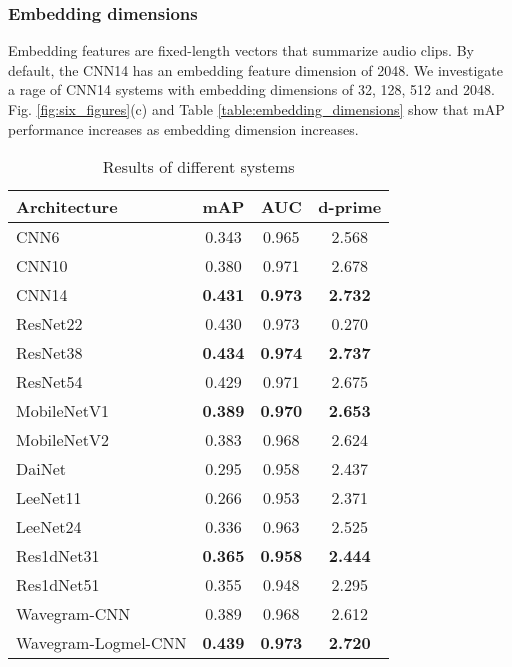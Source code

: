 \documentclass[journal]{IEEEtran}
\begin{document}
\subsubsection{Embedding dimensions}
Embedding features are fixed-length vectors that summarize audio clips. By default, the CNN14 has an embedding feature dimension of 2048. We investigate a rage of CNN14 systems with embedding dimensions of 32, 128, 512 and 2048. Fig. \ref{fig:six_figures}(c) and Table \ref{table:embedding_dimensions} show that mAP performance increases as embedding dimension increases.

\begin{table}[t]
\centering
\caption{Results of different systems}
\begin{tabular}{lccc}
 \toprule
 Architecture & mAP & AUC & d-prime \\
 \midrule
 CNN6 & 0.343 & 0.965 & 2.568 \\
 CNN10 & 0.380 & 0.971 & 2.678 \\
 CNN14 & \textbf{0.431} & \textbf{0.973} & \textbf{2.732} \\
 \midrule
 ResNet22 & 0.430 & 0.973 & 0.270 \\
 ResNet38 & \textbf{0.434} & \textbf{0.974} & \textbf{2.737} \\
 ResNet54 & 0.429 & 0.971 & 2.675 \\
 \midrule
 MobileNetV1 & \textbf{0.389} & \textbf{0.970} & \textbf{2.653} \\
 MobileNetV2 & 0.383 & 0.968 & 2.624 \\
 \midrule
 DaiNet \cite{dai2017very} & 0.295 & 0.958 & 2.437 \\
 LeeNet11 \cite{lee2017sample} & 0.266 & 0.953 & 2.371 \\
 LeeNet24 & 0.336 & 0.963 & 2.525 \\
 Res1dNet31 & \textbf{0.365} & \textbf{0.958} & \textbf{2.444} \\
 Res1dNet51 & 0.355 & 0.948 & 2.295 \\
 \midrule
 Wavegram-CNN & 0.389 & 0.968 & 2.612 \\
 Wavegram-Logmel-CNN & \textbf{0.439} & \textbf{0.973} & \textbf{2.720} \\
 \bottomrule
\end{tabular}
\label{table:all_systems}
\end{table}
\end{document}
